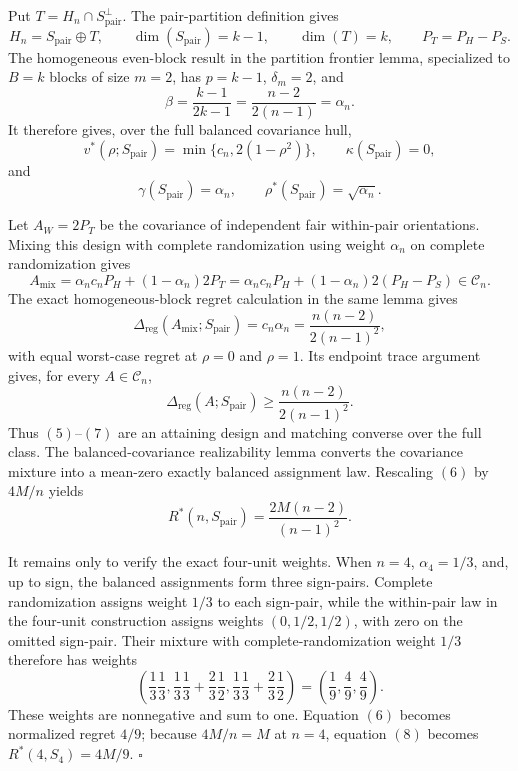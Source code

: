 Put \(T=H_n\cap S_{\mathrm{pair}}^\perp\).  The pair-partition definition gives
\[
H_n=S_{\mathrm{pair}}\mathbin\oplus T,
\qquad
\dim(S_{\mathrm{pair}})=k-1,
\qquad
\dim(T)=k,
\qquad
P_T=P_H-P_S.
\tag{1}
\]
The homogeneous even-block result in the partition frontier lemma, specialized to \(B=k\) blocks of size \(m=2\), has \(p=k-1\), \(\delta_m=2\), and
\[
\beta=\frac{k-1}{2k-1}
=\frac{n-2}{2(n-1)}=\alpha_n.
\tag{2}
\]
It therefore gives, over the full balanced covariance hull,
\[
v^*(\rho;S_{\mathrm{pair}})
=\min\{c_n,2(1-\rho^2)\},
\qquad
\kappa(S_{\mathrm{pair}})=0,
\tag{3}
\]
and
\[
\gamma(S_{\mathrm{pair}})=\alpha_n,
\qquad
\rho^*(S_{\mathrm{pair}})=\sqrt{\alpha_n}.
\tag{4}
\]

Let \(A_W=2P_T\) be the covariance of independent fair within-pair orientations.  Mixing this design with complete randomization using weight \(\alpha_n\) on complete randomization gives
\[
A_{\mathrm{mix}}
=\alpha_nc_nP_H+(1-\alpha_n)2P_T
=\alpha_nc_nP_H+(1-\alpha_n)2(P_H-P_S)
\in\mathcal C_n.
\tag{5}
\]
The exact homogeneous-block regret calculation in the same lemma gives
\[
\Delta_{\mathrm{reg}}(A_{\mathrm{mix}};S_{\mathrm{pair}})
=c_n\alpha_n
=\frac{n(n-2)}{2(n-1)^2},
\tag{6}
\]
with equal worst-case regret at \(\rho=0\) and \(\rho=1\).  Its endpoint trace argument gives, for every \(A\in\mathcal C_n\),
\[
\Delta_{\mathrm{reg}}(A;S_{\mathrm{pair}})
\geq\frac{n(n-2)}{2(n-1)^2}.
\tag{7}
\]
Thus \((5)\)--\((7)\) are an attaining design and matching converse over the full class.  The balanced-covariance realizability lemma converts the covariance mixture into a mean-zero exactly balanced assignment law.  Rescaling \((6)\) by \(4M/n\) yields
\[
R^*(n,S_{\mathrm{pair}})
=\frac{2M(n-2)}{(n-1)^2}.
\tag{8}
\]

It remains only to verify the exact four-unit weights.  When \(n=4\), \(\alpha_4=1/3\), and, up to sign, the balanced assignments form three sign-pairs.  Complete randomization assigns weight \(1/3\) to each sign-pair, while the within-pair law in the four-unit construction assigns weights \((0,1/2,1/2)\), with zero on the omitted sign-pair.  Their mixture with complete-randomization weight \(1/3\) therefore has weights
\[
\left(
\frac13\frac13,
\frac13\frac13+\frac23\frac12,
\frac13\frac13+\frac23\frac12
\right)
=\left(\frac19,\frac49,\frac49\right).
\tag{9}
\]
These weights are nonnegative and sum to one.  Equation \((6)\) becomes normalized regret \(4/9\); because \(4M/n=M\) at \(n=4\), equation \((8)\) becomes \(R^*(4,S_4)=4M/9\).  \(\square\)